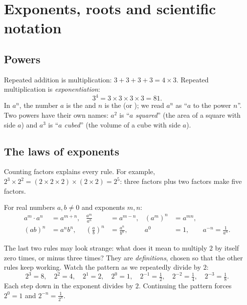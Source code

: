 \section{Exponents, roots and scientific notation}\label{sec:exponents}

\subsection{Powers}

Repeated addition is multiplication: $3 + 3 + 3 + 3 = 4 \times 3$. Repeated
multiplication is \emph{exponentiation}:
\[
  3^4 = 3 \times 3 \times 3 \times 3 = 81.
\]
In $a^n$, the number $a$ is the  and $n$ is the
 (or ); we read $a^n$ as ``$a$ to the power $n$''.
Two powers have their own names: $a^2$ is ``$a$ \emph{squared}'' (the area of
a square with side $a$) and $a^3$ is ``$a$ \emph{cubed}'' (the volume of a cube
with side $a$).

\subsection{The laws of exponents}

Counting factors explains every rule. For example,
$2^3 \times 2^2 = (2\times2\times2)\times(2\times2) = 2^5$: three factors plus
two factors make five factors.

\begin{theorem}\label{thm:exponent-laws}
For real numbers $a, b \neq 0$ and exponents $m, n$:
\begin{align*}
  a^m \cdot a^n &= a^{m+n}, &
  \frac{a^m}{a^n} &= a^{m-n}, &
  (a^m)^n &= a^{mn}, \\
  (ab)^n &= a^n b^n, &
  \left(\frac{a}{b}\right)^n &= \frac{a^n}{b^n}, &
  a^0 &= 1, \qquad a^{-n} = \frac{1}{a^n}.
\end{align*}
\end{theorem}

The last two rules may look strange: what does it mean to multiply $2$ by
itself zero times, or minus three times? They are \emph{definitions}, chosen so
that the other rules keep working. Watch the pattern as we repeatedly divide
by $2$:
\[
  2^3 = 8,\quad 2^2 = 4,\quad 2^1 = 2,\quad 2^0 = 1,\quad
  2^{-1} = \tfrac12,\quad 2^{-2} = \tfrac14,\quad 2^{-3} = \tfrac18 .
\]
Each step down in the exponent divides by $2$. Continuing the pattern forces
$2^0 = 1$ and $2^{-n} = \tfrac{1}{2^n}$.

